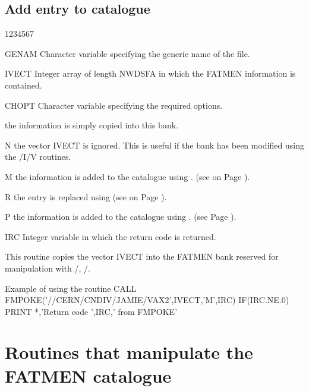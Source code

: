 \subsection{Add entry to catalogue}
\begin{DLtt}{1234567}
\item[GENAM]
Character variable specifying the generic name of the file.
\item[IVECT]
Integer array of length NWDSFA in which the FATMEN information is
contained.
\item[CHOPT]
Character variable specifying the required options.
\begin{DLtt}{12}
\item[ ]the information is simply copied into this bank.
\item[N]the vector IVECT is ignored. This is useful if the
bank has been modified using the /I/V routines.
\item[M]the information is added to the catalogue using .
(see on Page \pageref{FMMOD}).
\item[R]the entry is replaced using  (see on Page \pageref{FMMOD}).
\item[P]the information is added to the catalogue using . (see Page \pageref{FMPUT}).
\end{DLtt}
\item[IRC]
Integer variable in which the return code is returned.
\end{DLtt}
\par
This routine copies the vector IVECT into the FATMEN bank
reserved for manipulation with /, /.
\begin{XMPt}{Example of using the \protect{} routine}
      CALL FMPOKE('//CERN/CNDIV/JAMIE/VAX2',IVECT,'M',IRC)
      IF(IRC.NE.0) PRINT *,'Return code ',IRC,' from FMPOKE'
\end{XMPt}
 
\section{Routines that manipulate the FATMEN catalogue}
